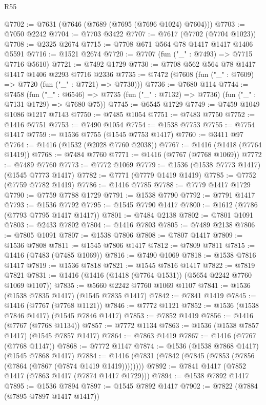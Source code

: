 \begin{lexlean}{R55}
\begin{coremodule}
{{@7702 := @7631 (@7646 (@7689 (@7695 (@7696 @1024) @7604)))
@7703 := @7050 @2242
@7704 := @7703 @3422
@7707 := @7617 (@7702 (@7704 @1023))
@7708 := @2325 @2674
@7715 := @7708 @671 @564 @78 @1417 @1417 @1406 @5591
@7716 := @1521 @2674
@7720 := @7707 (fun ("_" : @7493) => @7715 @7716 @5610)
@7721 := @7492 @1729
@7730 := @7708 @562 @564 @78 @1417 @1417 @1406 @2293 @7716 @2336
@7735 := @7472 (@7608 (fun ("_" : @7609) => @7720 (fun ("_" : @7721) => @7730)))
@7736 := @7680 @114
@7744 := @7458
    (fun ("_" : @6546) => @7735 (fun ("_" : @7132) => @7736) (fun ("_" : @7131 @1729) => @7680 @75))
@7745 := @6545 @1729
@7749 := @7459 @1049 @1086 @1217 @7143
@7750 := @7485 @1054
@7751 := @7483 @7750
@7752 := @1416 @7751
@7753 := @7490 @1054
@7754 := @1538 @7753
@7755 := @7754 @1417
@7759 := @1536 @7755 (@1545 @7753 @1417)
@7760 := @3411 @97
@7764 := @1416 (@1532 (@2028 @7760 @2038))
@7767 := @1416 (@1418 (@7764 @1419))
@7768 := @7484 @7760
@7771 := @1416 (@7767 (@7768 @1069))
@7772 := @7489 @7760
@7773 := @7772 @1069
@7779 := @1536 (@1538 @7773 @1417) (@1545 @7773 @1417)
@7782 := @7771 (@7779 @1419 @1419)
@7785 := @7752 (@7759 @7782 @1419)
@7786 := @1416 @7785
@7788 := @7779 @1417 @1729
@7790 := @7759 @7788 @1729
@7791 := @1538 @7790
@7792 := @7791 @1417
@7793 := @1536 @7792
@7795 := @1545 @7790 @1417
@7800 := @1612 (@7786 (@7793 @7795 @1417 @1417))
@7801 := @7484 @2138
@7802 := @7801 @1091
@7803 := @2433 @7802
@7804 := @1416 @7803
@7805 := @7489 @2138
@7806 := @7805 @1091
@7807 := @1538 @7806
@7808 := @7807 @1417
@7809 := @1536 @7808
@7811 := @1545 @7806 @1417
@7812 := @7809 @7811
@7815 := @1416 (@7483 (@7485 @1069))
@7816 := @7490 @1069
@7818 := @1538 @7816 @1417
@7819 := @1536 @7818
@7821 := @1545 @7816 @1417
@7822 := @7819 @7821
@7831 := @1416 (@1416 (@1418 (@7764 @1531)) (@5654 @2242 @7760 @1069 @1107))
@7835 := @5660 @2242 @7760 @1069 @1107
@7841 := @1536 (@1538 @7835 @1417) (@1545 @7835 @1417)
@7842 := @7841 @1419
@7845 := @1416 (@7767 (@7768 @1121))
@7846 := @7772 @1121
@7852 := @1536 (@1538 @7846 @1417) (@1545 @7846 @1417)
@7853 := @7852 @1419
@7856 := @1416 (@7767 (@7768 @1134))
@7857 := @7772 @1134
@7863 := @1536 (@1538 @7857 @1417) (@1545 @7857 @1417)
@7864 := @7863 @1419
@7867 := @1416 (@7767 (@7768 @1147))
@7868 := @7772 @1147
@7874 := @1536 (@1538 @7868 @1417) (@1545 @7868 @1417)
@7884 := @1416 (@7831 (@7842 (@7845 (@7853 (@7856 (@7864 (@7867 (@7874 @1419 @1419))))))))
@7892 := @7841 @1417 (@7852 @1417 (@7863 @1417 (@7874 @1417 @1729)))
@7894 := @1538 @7892 @1417
@7895 := @1536 @7894
@7897 := @1545 @7892 @1417
@7902 := @7822 (@7884 (@7895 @7897 @1417 @1417))
}}
\end{coremodule}
\end{lexlean}
